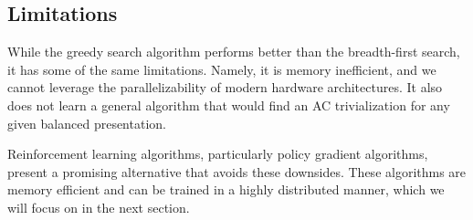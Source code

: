 \subsection{Limitations}

While the greedy search algorithm performs better than the breadth-first search, it has some of the same limitations.
Namely, it is memory inefficient, and we cannot leverage the parallelizability of modern hardware architectures.
It also does not learn a general algorithm that would find an AC trivialization for any given balanced presentation.

Reinforcement learning algorithms, particularly policy gradient algorithms, present a promising alternative that avoids these downsides.
These algorithms are memory efficient and can be trained in a highly distributed manner, which we will focus on in the next section.


